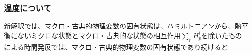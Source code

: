 \subsubsection{温度について}
新解釈では、マクロ・古典的物理変数の固有状態は、ハミルトニアンから、熱平衡にないミクロな状態とマクロ・古典的な状態の相互作用$\sum_p H_p^i$を除いたものによる時間発展では、マクロ・古典的物理変数の固有状態であり続けると